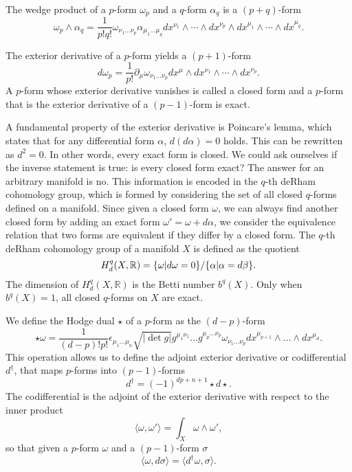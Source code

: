 The wedge product of a $p$-form $\omega_p$ and a $q$-form $\alpha_q$ is a $(p+q)$-form
\begin{equation}
  \omega_p \wedge \alpha_q  = \frac{1}{p!q!}\omega_{\nu_1\ldots\nu_p}
\alpha_{\mu_1\ldots\mu_q}dx^{\nu_1}\wedge \cdots  \wedge dx^{\nu_p}\wedge dx^{\mu_1}\wedge \cdots  \wedge dx^{\mu_q}.
\end{equation}

The exterior derivative of a $p$-form yields a $(p+1)$-form
\begin{equation}
  d\omega_p = \frac{1}{p!}\partial_\mu \omega_{\nu_1\ldots\nu_p}dx^\mu\wedge dx^{\nu_1}\wedge\cdots\wedge dx^{\nu_p}.
\end{equation}
A $p$-form whose exterior derivative vanishes is called a closed form and a $p$-form that is the exterior derivative
of a $(p-1)$-form is exact.

A fundamental property of the exterior derivative is Poincare's lemma, which states that for any differential form $\alpha$, $d(d\alpha)=0$ holds.
This can be rewritten as $d^2=0$. In other words, every exact form is closed.
We could ask ourselves if the inverse statement is true:
is every closed form exact?
The answer for an arbitrary manifold is no. %
This information is encoded in the $q$-th deRham cohomology group, which is formed by considering
the set of all closed $q$-forms defined on a manifold.
Since given a closed form $\omega$, we can always find another closed form by adding an exact form
$\omega' = \omega+d\alpha$, we consider the equivalence relation that two forms are equivalent if
they differ by a closed form.
The $q$-th deRham cohomology group of a manifold $X$ is defined as the quotient
\begin{equation}
  H^q_d(X,\mathbb R)=\qty{\omega| d\omega=0}/\qty{\alpha|\alpha=d\beta}.
\end{equation}
The dimension of $H^q_d(X,\mathbb R)$ is the Betti number $b^q(X)$.
Only when $b^q(X)=1$, all closed $q$-forms on $X$ are exact.

We define the Hodge dual $\star$ of a $p$-form as the $(d-p)$-form
\begin{equation}
  \star \omega = \frac{1}{(d-p)!p!}\epsilon_{\mu_1\ldots\mu_n}\sqrt{|\det g|} g^{\mu_1 \nu_1}\ldots g^{\mu_p\ldots\nu_p}\omega_{\nu_1\ldots\nu_p}dx^{\mu_{p+1}}\wedge \ldots\wedge dx^{\mu_d}.
\end{equation}
This operation allows us to define the adjoint exterior derivative or codifferential $d^\dagger$, 
that maps $p$-forms into $(p-1)$-forms
\begin{equation}
  d^\dagger=(-1)^{dp+n+1}\star d \star. 
\end{equation}
The codifferential is the adjoint of the exterior derivative with respect to the inner product
\begin{equation}
  \langle \omega,\omega'\rangle = \int_X \omega\wedge\omega',
\end{equation}
so that given a $p$-form $\omega$ and a $(p-1)$-form $\sigma$
\begin{equation}
  \langle \omega, d\sigma \rangle = \langle d^\dagger \omega, \sigma\rangle.
\end{equation}

